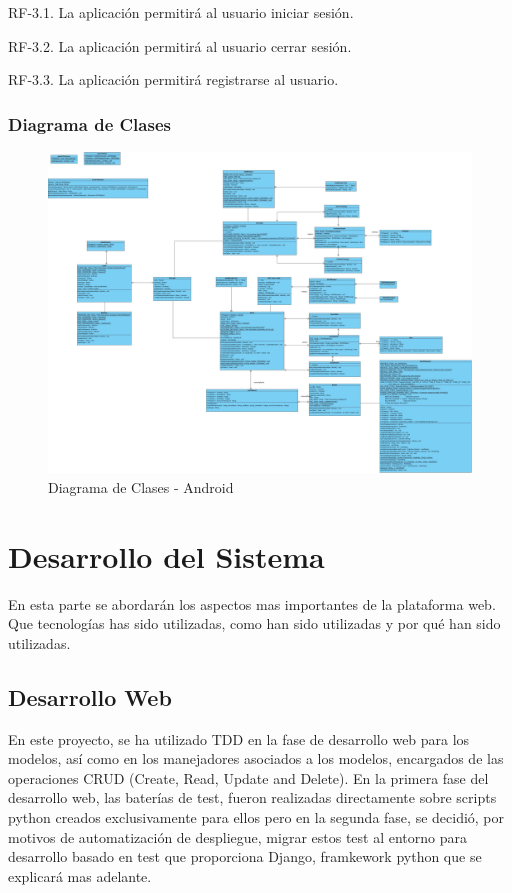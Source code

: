 \documentclass[a4paper,11pt]{book}
\begin{document}
	RF-3.1. La aplicación permitirá al usuario iniciar sesión.
	
	RF-3.2. La aplicación permitirá al usuario cerrar sesión.
	
	RF-3.3. La aplicación permitirá registrarse al usuario.



\subsection{Diagrama de Clases}

\begin{figure}[H] 
\centering 
\includegraphics[scale=0.15]{imagenes/clases/clasesAndroid.jpg}
\caption{ Diagrama de Clases - Android\cite{propio}  }  
\end{figure}




\chapter{Desarrollo del Sistema}
En esta parte se abordarán los aspectos mas importantes de la plataforma web. Que tecnologías has sido utilizadas, como han sido utilizadas y por qué han sido utilizadas.


\section{Desarrollo Web}

En este proyecto, se ha utilizado TDD en la fase de desarrollo web para los modelos, así como en los manejadores asociados a los modelos, encargados de las operaciones CRUD (Create, Read, Update and Delete). En la primera fase del desarrollo web, las baterías de test, fueron realizadas directamente sobre scripts python creados exclusivamente para ellos pero en la segunda fase, se decidió, por motivos de automatización de despliegue,  migrar estos test al entorno para desarrollo basado en test que proporciona Django, framkework python que se explicará mas adelante.
\end{document}
